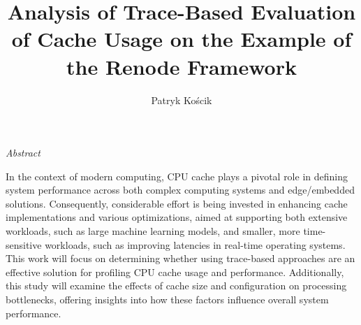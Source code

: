 \documentclass[english,masters,a4paper,oneside]{ppfcmthesis}
\author
{%
   Patryk Kościk \album{144635}
}
\title
{%
   Analysis of Trace-Based Evaluation of Cache Usage on the Example of the Renode Framework
}
\begin{document}
\frontmatter\pagestyle{empty}%
\maketitle\cleardoublepage%


\thispagestyle{empty}\vspace*{\fill}%
\vfill\cleardoublepage%



\begin{vplace}

\begin{center}
   \huge{\textit{Abstract}}
\end{center}

In the context of modern computing, CPU cache plays a pivotal role in defining
system performance across both complex computing systems and edge/embedded solutions.
%
Consequently, considerable effort is being invested in enhancing cache
implementations and various optimizations, aimed at supporting both
extensive workloads, such as large machine learning models, and smaller, more
time-sensitive workloads, such as improving latencies in real-time operating
systems.
%
This work will focus on determining whether using trace-based approaches are an
effective solution for profiling CPU cache usage and performance.
%
Additionally, this study will examine the effects of cache size and configuration
on processing bottlenecks, offering insights into how these factors influence
overall system performance.

\end{vplace}

\newpage
\end{document}
